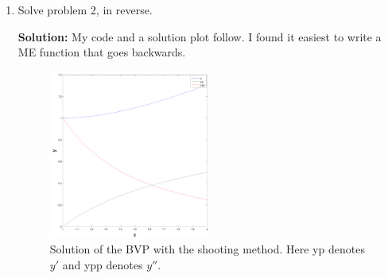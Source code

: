\documentclass[11pt]{article}
\begin{document}
\begin{enumerate}
\item Solve problem 2, in reverse.

\bigskip
\textbf{Solution:} My code and a solution plot follow.
I found it easiest to write a ME function that goes backwards.



\begin{figure}[h!]
  \centering
    \includegraphics[width=0.5\textwidth]{andy_hw07_prb03_01.pdf}
  \caption{Solution of the BVP with the shooting method. Here yp denotes $y'$ and ypp denotes $y''$.}
\end{figure}

\begin{align*} \end{align*}

\end{enumerate}


\end{document}
